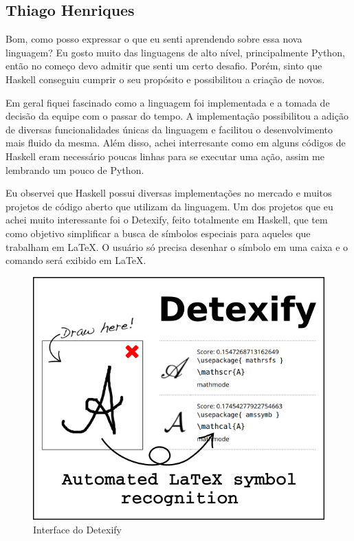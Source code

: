 \documentclass[
  12pt,				         %
  oneside,			       %
  a4paper,			       %
  english,		       	 %
  brazil,			      	 %
]{abntex2}
\begin{document}
\begin{apendicesenv}
        \chapter{Thiago Henriques}
        
        Bom, como posso expressar o que eu senti aprendendo sobre essa nova linguagem? Eu gosto muito das linguagens de alto nível, principalmente Python,
        então no começo devo admitir que senti um certo desafio. Porém, sinto que Haskell conseguiu cumprir o 
        seu propósito e possibilitou a criação de novos.

        Em geral fiquei fascinado como a linguagem foi implementada e a tomada de decisão da equipe com o passar do tempo. A implementação
        possibilitou a adição de diversas funcionalidades únicas da linguagem e facilitou o desenvolvimento mais fluido da mesma.
        Além disso, achei interresante como em alguns códigos de Haskell eram necessário poucas linhas para se executar uma ação, assim
        me lembrando um pouco de Python.

        Eu observei que Haskell possui diversas implementações no mercado e muitos projetos de código aberto que utilizam da linguagem.
        Um dos projetos que eu achei muito interessante foi o Detexify, feito totalmente em Haskell, que tem como objetivo simplificar a 
        busca de símbolos especiais para aqueles que trabalham em \LaTeX. O usuário só precisa desenhar o símbolo em uma caixa e
        o comando será exibido em \LaTeX.
        
        \begin{figure}[ht]
          \centering
          \includegraphics[scale=0.8]{detexify.png}
          \caption{Interface do Detexify}
        \end{figure}


\end{apendicesenv}
\end{document}
